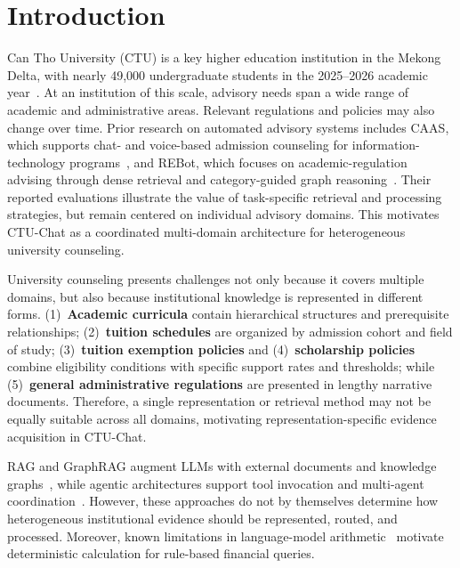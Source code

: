 \section{Introduction}
\label{sec:intro}

Can Tho University (CTU) is a key higher education institution in the Mekong Delta, with nearly 49,000 undergraduate students in the 2025--2026 academic year~\cite{ctu2025opening}. At an institution of this scale, advisory needs span a wide range of academic and administrative areas. Relevant regulations and policies may also change over time. Prior research on automated advisory systems includes CAAS, which supports chat- and voice-based admission counseling for information-technology programs~\cite{ma2023caas}, and REBot, which focuses on academic-regulation advising through dense retrieval and category-guided graph reasoning~\cite{ma2025rebot}. Their reported evaluations illustrate the value of task-specific retrieval and processing strategies, but remain centered on individual advisory domains. This motivates CTU-Chat as a coordinated multi-domain architecture for heterogeneous university counseling.

University counseling presents challenges not only because it covers multiple domains, but also because institutional knowledge is represented in different forms. (1)~\textbf{Academic curricula} contain hierarchical structures and prerequisite relationships; (2)~\textbf{tuition schedules} are organized by admission cohort and field of study; (3)~\textbf{tuition exemption policies} and (4)~\textbf{scholarship policies} combine eligibility conditions with specific support rates and thresholds; while (5)~\textbf{general administrative regulations} are presented in lengthy narrative documents. Therefore, a single representation or retrieval method may not be equally suitable across all domains, motivating representation-specific evidence acquisition in CTU-Chat.

RAG and GraphRAG augment LLMs with external documents and knowledge graphs~\cite{lewis2020rag,gao2023rag_survey,edge2024graphrag}, while agentic architectures support tool invocation and multi-agent coordination~\cite{yao2023react,wu2023autogen,schick2023toolformer}. However, these approaches do not by themselves determine how heterogeneous institutional evidence should be represented, routed, and processed. Moreover, known limitations in language-model arithmetic~\cite{qian2023limitations} motivate deterministic calculation for rule-based financial queries.

